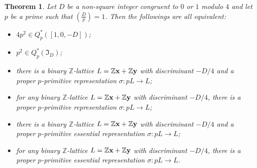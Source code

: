 \documentclass{amsart}
\newtheorem{thm}{Theorem}[section]
\theoremstyle{definition}
\theoremstyle{remark}
\numberwithin{equation}{section}
\begin{document}
\begin{thm} \label{ppre} Let $D$ be a non-square integer congruent to $0$ or $1$ modulo $4$  and let $p$ be a prime such that $\left(\frac Dp\right)=1$. Then the followings are all equivalent:
\begin{itemize}
\item [(i)] $4p^2 \in Q_p^*([1,0,-D])$;
\item [(ii)] $p^2\in Q_p^*(\mathfrak I_D)$;
\item [(iii)] there is a binary ${{\mathbb Z}}$-lattice $L={{\mathbb Z}} \bold x+{{\mathbb Z}} \bold y$ with discriminant $-D/4$ and a proper $p$-primitive representation $\sigma  : pL \to L$;
\item [(iv)] for any binary ${{\mathbb Z}}$-lattice $L={{\mathbb Z}} \bold x+{{\mathbb Z}} \bold y$ with discriminant $-D/4$, there is a proper $p$-primitive representation $\sigma  : pL \to L$;
\item [(v)] there is a binary ${{\mathbb Z}}$-lattice $L={{\mathbb Z}} \bold x+{{\mathbb Z}} \bold y$ with discriminant $-D/4$ and a proper $p$-primitive essential representation $\sigma  : pL \to L$;
\item [(vi)] for any binary ${{\mathbb Z}}$-lattice $L={{\mathbb Z}} \bold x+{{\mathbb Z}} \bold y$ with discriminant $-D/4$, there is a proper $p$-primitive essential representation $\sigma  : pL \to L$.
\end{itemize}
\end{thm}
\end{document}
